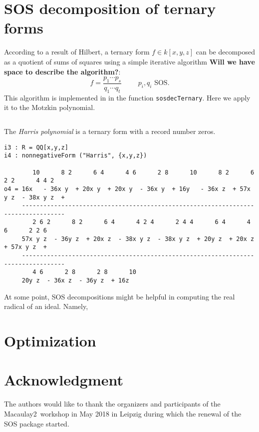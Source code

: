 \documentclass[11pt]{amsart}
\theoremstyle{plain}%
\theoremstyle{definition}
\theoremstyle{remark}
\newcommand{\Mac}{Macaulay2\xspace}
\begin{document}
\section{SOS decomposition of ternary forms}

According to a result of Hilbert, a ternary form $f\in k[x,y,z]$ can
be decomposed as a quotient of sums of squares using a simple
iterative algorithm \textbf{Will we have space to describe the
  algorithm?}:
\[
  f = \frac{p_{1}\cdots p_{s}}{q_{1}\cdots q_{t}} \qquad \text {
    $p_{i},q_{i}$ SOS}.
\]
This algorithm is implemented in in the function \verb|sosdecTernary|.
Here we apply it to the Motzkin polynomial.
{\small
\begin{verbatim}

\end{verbatim}
}

The \emph{Harris polynomial} is a ternary form with a record number zeros. 
{\small
\begin{verbatim}
i3 : R = QQ[x,y,z]
i4 : nonnegativeForm ("Harris", {x,y,z})

        10      8 2      6 4      4 6      2 8      10      8 2      6 2 2      4 4 2
o4 = 16x   - 36x y  + 20x y  + 20x y  - 36x y  + 16y   - 36x z  + 57x y z  - 38x y z  +
     ----------------------------------------------------------------------------------
        2 6 2      8 2      6 4      4 2 4      2 4 4      6 4      4 6      2 2 6
     57x y z  - 36y z  + 20x z  - 38x y z  - 38x y z  + 20y z  + 20x z  + 57x y z  +
     ----------------------------------------------------------------------------------
        4 6      2 8      2 8      10
     20y z  - 36x z  - 36y z  + 16z
\end{verbatim}
}

At some point, SOS decompositions might be helpful in computing the
real radical of an ideal.
Namely,

\section{Optimization}




\section*{Acknowledgment}
\label{sec:acknowledgement}
The authors would like to thank the organizers and participants of the
\Mac\ workshop in May 2018 in Leipzig during which the renewal of the
SOS package started.



\end{document}
